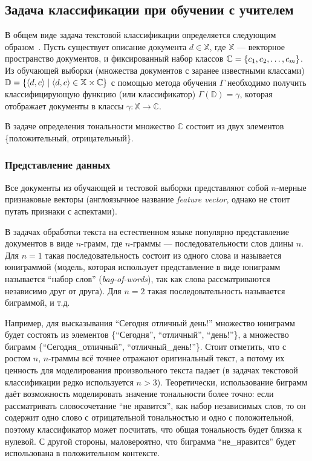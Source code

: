 \subsection{Задача классификации при обучении с учителем}

В общем виде задача текстовой классификации определяется следующим 
образом~\cite{Manning2008}. 
Пусть существует описание документа $d \in \mathbb{X}$, где $\mathbb{X}$ --- векторное пространство документов, и фиксированный набор классов 
$\mathbb{C} = \left \{ c_1, c_2, \ldots, c_m \right \}$. 
Из обучающей выборки (множества документов с заранее известными классами)
$\mathbb{D} = \{\left \langle d, c \right \rangle  \mid \left \langle d, c \right \rangle  \in \mathbb{X} \times \mathbb{C}\}$
с помощью метода обучения $\Gamma$ необходимо получить классифицирующую 
функцию (или классификатор) 
$\Gamma(\mathbb{D}) = \gamma$, которая отображает документы в классы $\gamma: \mathbb{X} \rightarrow \mathbb{C}$.

В задаче определения тональности множество $\mathbb{C}$ состоит 
из двух элементов \{положительный, отрицательный\}.

\subsubsection{Представление данных}
Все документы из обучающей и тестовой выборки представляют собой $n$-мерные признаковые векторы 
(англоязычное название \textit{feature vector}, однако не стоит путать признаки с аспектами). 

В задачах обработки текста на естественном языке популярно представление 
документов в виде $n$-грамм, где $n$-граммы --- последовательности слов длины $n$. 
Для $n = 1$ такая последовательность состоит из одного слова и называется 
юниграммой (модель, которая использует представление в виде юниграмм 
называется ``набор слов'' (\textit{bag-of-words}), так как слова рассматриваются 
независимо друг от друга). Для $n = 2$ такая последовательность называется биграммой, и т.д.

Например, для высказывания ``Сегодня отличный день!'' множество юниграмм 
будет состоять из элементов \{``Сегодня'', ``отличный'', ``день!''\}, а множество
биграмм \{``Сегодня\_отличный'', ``отличный\_день!''\}. 
Стоит отметить, что с ростом $n$, $n$-граммы всё точнее 
отражают оригинальный текст, а потому их ценность
для моделирования произвольного текста падает (в задачах текстовой 
классификации редко используется $n > 3$). Теоретически, использование биграмм
даёт возможность моделировать значение тональности более точно: если 
рассматривать словосочетание ``не нравится'', как набор независимых слов, то
он содержит одно слово с отрицательной тональностью
и одно с положительной, поэтому
классификатор может посчитать, что общая тональность будет близка к нулевой. С 
другой стороны, маловероятно, что биграмма ``не\_нравится'' 
будет использована в положительном контексте.

